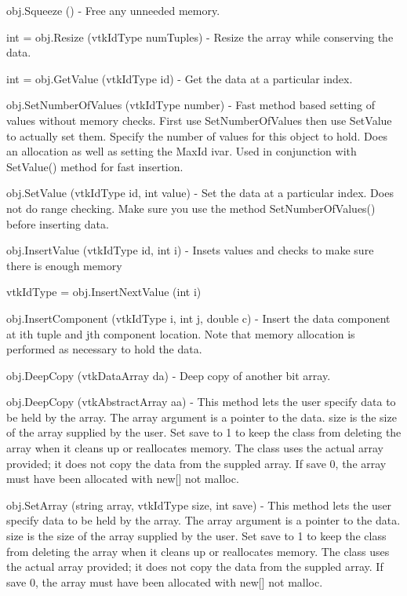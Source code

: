 \begin{DoxyItemize}
\item {\ttfamily obj.\-Squeeze ()} -\/ Free any unneeded memory.  
\item {\ttfamily int = obj.\-Resize (vtk\-Id\-Type num\-Tuples)} -\/ Resize the array while conserving the data.  
\item {\ttfamily int = obj.\-Get\-Value (vtk\-Id\-Type id)} -\/ Get the data at a particular index.  
\item {\ttfamily obj.\-Set\-Number\-Of\-Values (vtk\-Id\-Type number)} -\/ Fast method based setting of values without memory checks. First use Set\-Number\-Of\-Values then use Set\-Value to actually set them. Specify the number of values for this object to hold. Does an allocation as well as setting the Max\-Id ivar. Used in conjunction with Set\-Value() method for fast insertion.  
\item {\ttfamily obj.\-Set\-Value (vtk\-Id\-Type id, int value)} -\/ Set the data at a particular index. Does not do range checking. Make sure you use the method Set\-Number\-Of\-Values() before inserting data.  
\item {\ttfamily obj.\-Insert\-Value (vtk\-Id\-Type id, int i)} -\/ Insets values and checks to make sure there is enough memory  
\item {\ttfamily vtk\-Id\-Type = obj.\-Insert\-Next\-Value (int i)}  
\item {\ttfamily obj.\-Insert\-Component (vtk\-Id\-Type i, int j, double c)} -\/ Insert the data component at ith tuple and jth component location. Note that memory allocation is performed as necessary to hold the data.  
\item {\ttfamily obj.\-Deep\-Copy (vtk\-Data\-Array da)} -\/ Deep copy of another bit array.  
\item {\ttfamily obj.\-Deep\-Copy (vtk\-Abstract\-Array aa)} -\/ This method lets the user specify data to be held by the array. The array argument is a pointer to the data. size is the size of the array supplied by the user. Set save to 1 to keep the class from deleting the array when it cleans up or reallocates memory. The class uses the actual array provided; it does not copy the data from the suppled array. If save 0, the array must have been allocated with new\mbox{[}\mbox{]} not malloc.  
\item {\ttfamily obj.\-Set\-Array (string array, vtk\-Id\-Type size, int save)} -\/ This method lets the user specify data to be held by the array. The array argument is a pointer to the data. size is the size of the array supplied by the user. Set save to 1 to keep the class from deleting the array when it cleans up or reallocates memory. The class uses the actual array provided; it does not copy the data from the suppled array. If save 0, the array must have been allocated with new\mbox{[}\mbox{]} not malloc.  

\end{DoxyItemize}
